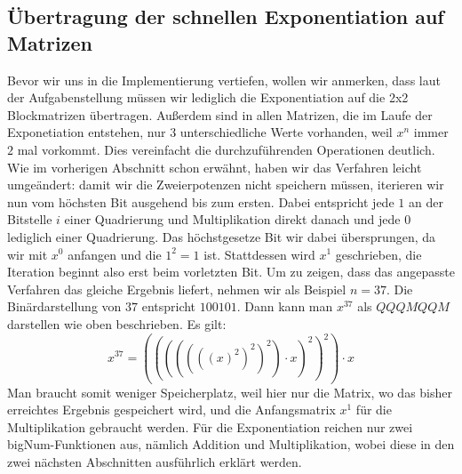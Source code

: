 \documentclass[course=erap]{aspdoc}
\begin{document}
\subsection{Übertragung der schnellen Exponentiation auf Matrizen}%
Bevor wir uns in die Implementierung vertiefen, wollen wir anmerken, dass laut der Aufgabenstellung müssen wir lediglich die Exponentiation auf die 2x2 Blockmatrizen übertragen. Außerdem sind in allen Matrizen, die im Laufe der Exponetiation entstehen, nur $3$ unterschiedliche Werte vorhanden, weil $x^n$ immer $2$ mal vorkommt. Dies vereinfacht die durchzuführenden Operationen deutlich. 
Wie im vorherigen Abschnitt schon erwähnt, haben wir das Verfahren leicht umgeändert: damit wir die Zweierpotenzen nicht speichern müssen, iterieren wir nun vom höchsten Bit ausgehend bis zum ersten. Dabei entspricht jede $1$ an der Bitstelle $i$ einer Quadrierung und Multiplikation direkt danach und jede $0$ lediglich einer Quadrierung. Das höchstgesetze Bit wir dabei übersprungen, da wir mit $x^0$ anfangen und die $1^2 = 1$ ist. Stattdessen wird $x^1$ geschrieben, die Iteration beginnt also erst beim vorletzten Bit.
Um zu zeigen, dass das angepasste Verfahren das gleiche Ergebnis liefert, nehmen wir als Beispiel $n = 37$. Die Binärdarstellung von $37$ entspricht $100101$. Dann kann man $x^{37}$ als $Q Q QM Q QM$ darstellen wie oben beschrieben. Es gilt:
\begin{equation}
    x^{37} = (((((((x)^2)^2)^2) \cdot x)^2)^2) \cdot x
\end{equation}
Man braucht somit weniger Speicherplatz, weil hier nur die Matrix, wo das bisher erreichtes Ergebnis gespeichert wird, und die Anfangsmatrix $x^1$ für die Multiplikation gebraucht werden.
Für die Exponentiation reichen nur zwei bigNum-Funktionen aus, nämlich Addition und Multiplikation, wobei diese in den zwei nächsten Abschnitten ausführlich erklärt werden.
\end{document}
